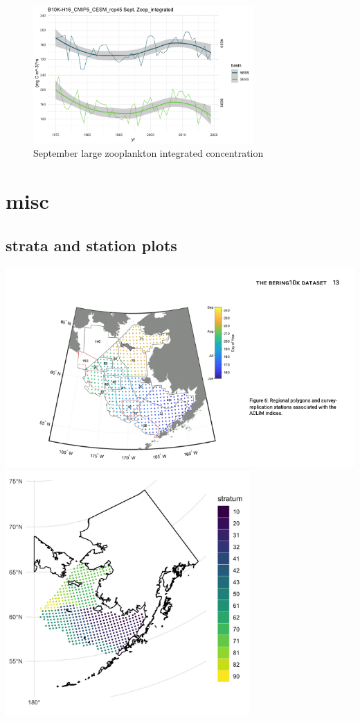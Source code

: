 \documentclass[
]{article}
\begin{document}
\begin{figure}
\centering
\includegraphics[width=0.75\textwidth,height=\textheight]{Figs/Hind_Sept_large_Zoop.jpg}
\caption{September large zooplankton integrated concentration}
\end{figure}

\hypertarget{misc}{%
\section{misc}\label{misc}}

\hypertarget{strata-and-station-plots}{%
\subsection{strata and station plots}\label{strata-and-station-plots}}

\includegraphics[width=1\textwidth,height=\textheight]{Figs/Strata_Kearney2021.png}
\includegraphics[width=0.7\textwidth,height=\textheight]{Figs/stations.jpg}
\end{document}
